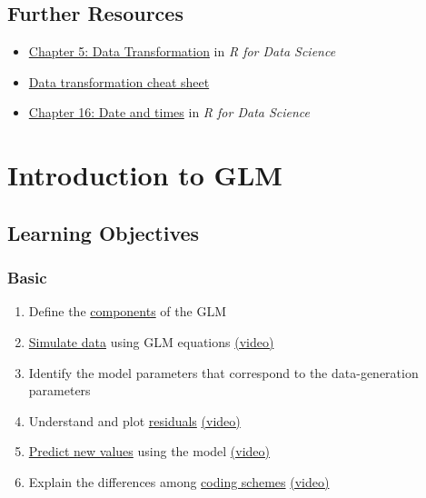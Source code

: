 \documentclass[
  oneside]{book}
\providecommand{\tightlist}{%
  \setlength{\itemsep}{0pt}\setlength{\parskip}{0pt}}
\begin{document}
\hypertarget{resources-dplyr}{%
\section{Further Resources}\label{resources-dplyr}}

\begin{itemize}
\tightlist
\item
  \href{http://r4ds.had.co.nz/transform.html}{Chapter 5: Data Transformation} in \emph{R for Data Science}
\item
  \href{https://github.com/rstudio/cheatsheets/raw/master/data-transformation.pdf}{Data transformation cheat sheet}
\item
  \href{http://r4ds.had.co.nz/dates-and-times.html}{Chapter 16: Date and times} in \emph{R for Data Science}
\end{itemize}

\hypertarget{glm}{%
\chapter{Introduction to GLM}\label{glm}}

\hypertarget{ilo-glm}{%
\section{Learning Objectives}\label{ilo-glm}}

\hypertarget{basic-4}{%
\subsection*{Basic}\label{basic-4}}

\begin{enumerate}
\def\labelenumi{\arabic{enumi}.}
\tightlist
\item
  Define the \protect\hyperlink{glm-components}{components} of the GLM
\item
  \protect\hyperlink{sim-glm}{Simulate data} using GLM equations \href{https://youtu.be/JQ90LnVCbKc}{(video)}
\item
  Identify the model parameters that correspond to the data-generation parameters
\item
  Understand and plot \protect\hyperlink{residuals}{residuals} \href{https://youtu.be/sr-NtxiH2Qk}{(video)}
\item
  \protect\hyperlink{predict}{Predict new values} using the model \href{https://youtu.be/0o4LEbVVWfM}{(video)}
\item
  Explain the differences among \protect\hyperlink{coding-schemes}{coding schemes} \href{https://youtu.be/SqL28AbLj3g}{(video)}
\end{enumerate}
\end{document}
